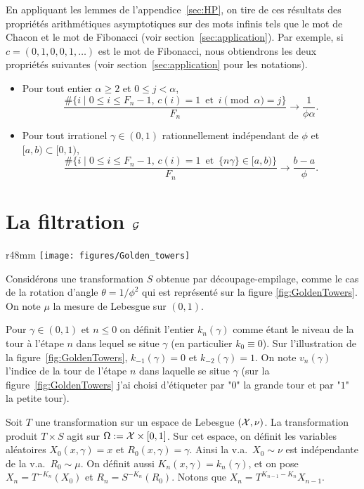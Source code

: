 \documentclass[12pt,a4paper]{article}
\begin{document}
 En appliquant les lemmes de l'appendice~\ref{sec:HP}, on tire de 
ces résultats des propriétés arithmétiques asymptotiques sur des mots infinis tels que 
le mot de Chacon et le mot de Fibonacci (voir section~\ref{sec:application}).
Par exemple, si $c=(0, 1, 0, 0, 1, \ldots)$ est le mot de Fibonacci, nous obtiendrons 
les deux propriétés suivantes (voir section~\ref{sec:application} pour les notations).  
\begin{itemize}
\item Pour tout entier $\alpha \geq 2$ et $0 \leq j < \alpha$,
$$
\frac{\#\bigl\{i \mid 0 \leq i \leq F_n-1,\, c(i)=1 \,\text{  et  }\, i\!\!\!\!\pmod\alpha=j \bigr\}}{F_n} \to \frac{1}{\phi\alpha}.
$$

\item Pour tout irrationel $\gamma \in (0,1)$ rationnellement indépendant de $\phi$ et 
$[a,b) \subset [0,1)$, 
$$
\frac{\#\bigl\{i \mid 0 \leq i \leq F_n-1,\, c(i)=1 \,\text{  et  }\,  \{n\gamma\} \in [a,b) \bigr\}}{F_n} \to \frac{b-a}{\phi}.
$$
\end{itemize}


\section{La filtration $\mathcal{G}$}


\begin{wrapfigure}{r}{48mm}
   \centering
   	\texttt{[image: figures/Golden\_towers]}
   \caption{Golden towers}
   \label{fig:GoldenTowers}
\end{wrapfigure}
Considérons une transformation $S$ obtenue par découpage-empilage, 
comme le cas de la rotation d'angle $\theta=1/\phi^2$ qui 
est représenté sur la figure \ref{fig:GoldenTowers}. 
On note $\mu$ la mesure de Lebesgue sur $(0,1)$. 

Pour $\gamma \in (0,1)$ et $n \leq 0$ on définit l'entier 
$k_n(\gamma)$ comme étant le niveau de la tour à l'étape $n$ 
dans lequel se situe $\gamma$ (en particulier $k_0 \equiv 0$). 
Sur l'illustration de la figure~\ref{fig:GoldenTowers}, 
$k_{-1}(\gamma) = 0$ et $k_{-2}(\gamma)=1$. 
On note $v_n(\gamma)$ l'indice de la tour de l'étape $n$ dans laquelle 
se situe $\gamma$ (sur la figure~\ref{fig:GoldenTowers} 
j'ai choisi d'étiqueter par "$0$" la grande tour et par "$1$" la 
petite tour).

Soit $T$ une transformation sur un espace de Lebesgue 
$(\mathcal{X}, \nu)$. La transformation produit $T \times S$ 
agit sur $\Omega := \mathcal{X} \times [0,1]$. 
Sur cet espace, on définit les variables aléatoires 
$X_0(x, \gamma)=x$ et $R_0(x, \gamma)=\gamma$. 
Ainsi la v.a.\ $X_0 \sim \nu$ est indépendante de la v.a.\ $R_0 \sim \mu$. 
On définit aussi $K_n(x,\gamma)=k_n(\gamma)$, et on 
pose $\boxed{X_n = T^{-K_n}(X_0)}$ et 
$\boxed{R_n = S^{-K_n}(R_0)}$. 
Notons que $X_n = T^{K_{n-1}-K_n}X_{n-1}$. 
\end{document}
